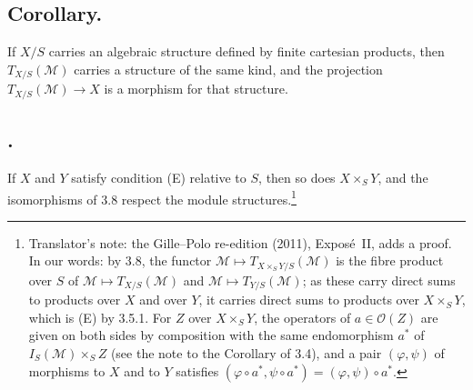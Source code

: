 \subsection*{Corollary.}
If \(X/S\) carries an algebraic structure defined by finite cartesian
products, then \(T_{X/S}(\mathcal M)\) carries a structure of the same
kind, and the projection \(T_{X/S}(\mathcal M)\to X\) is a morphism for
that structure.

\subsection*{.}
If \(X\) and \(Y\) satisfy condition (E) relative to \(S\), then so does
\(X\times_SY\), and the isomorphisms of 3.8 respect the module
structures.\footnote{Translator's note: the Gille--Polo re-edition (2011),
Expos\'e~II, adds a proof. In our words: by 3.8, the functor
\(\mathcal M\mapsto T_{X\times_SY/S}(\mathcal M)\) is the fibre product over
\(S\) of \(\mathcal M\mapsto T_{X/S}(\mathcal M)\) and
\(\mathcal M\mapsto T_{Y/S}(\mathcal M)\); as these carry direct sums to
products over \(X\) and over \(Y\), it carries direct sums to products over
\(X\times_SY\), which is (E) by 3.5.1. For \(Z\) over \(X\times_SY\), the
operators of \(a\in\mathcal O(Z)\) are given on both sides by composition
with the same endomorphism \(a^*\) of \(I_S(\mathcal M)\times_SZ\) (see the
note to the Corollary of 3.4), and a pair \((\varphi,\psi)\) of morphisms to
\(X\) and to \(Y\) satisfies
\((\varphi\circ a^*,\psi\circ a^*)=(\varphi,\psi)\circ a^*\).}

